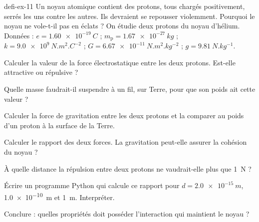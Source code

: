 \begin{blocEdition}{defi-ex-11}
Un noyau atomique contient des protons, tous chargés positivement, serrés les uns contre les autres. Ils devraient se
repousser violemment. Pourquoi le noyau ne vole-t-il pas en éclats ? On étudie deux protons du noyau d'hélium.
Données : $e=\qty{1,60e-19}{C}$ ; $m_\mathrm{p}=\qty{1,67e-27}{kg}$ ; $k=\qty{9,0e9}{N.m^2.C^{-2}}$ ; $G=\qty{6,67e-11}{N.m^2.kg^{-2}}$ ; $g=\qty{9,81}{N.kg^{-1}}$.
\begin{questions}
\item Calculer la valeur de la force électrostatique entre les deux protons. Est-elle attractive ou répulsive ?
\item Quelle masse faudrait-il suspendre à un fil, sur Terre, pour que son poids ait cette valeur ?
\item Calculer la force de gravitation entre les deux protons et la comparer au poids d'un proton à la surface de la Terre.
\item Calculer le rapport des deux forces. La gravitation peut-elle assurer la cohésion du noyau ?
\item À quelle distance la répulsion entre deux protons ne vaudrait-elle plus que \qty{1}{N} ?
\item Écrire un programme Python qui calcule ce rapport pour $d=\qty{2,0e-15}{m}$, \qty{1,0e-10}{m} et \qty{1}{m}. Interpréter.
\item Conclure : quelles propriétés doit posséder l'interaction qui maintient le noyau ?
\end{questions}
\end{blocEdition}

